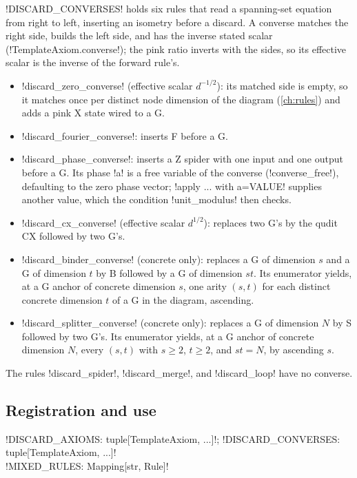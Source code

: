 \py!DISCARD_CONVERSES! holds six rules that read a spanning-set equation from right to left, inserting an isometry before a discard. A converse matches the right side, builds the left side, and has the inverse stated scalar (\py!TemplateAxiom.converse!); the pink ratio inverts with the sides, so its effective scalar is the inverse of the forward rule's.
\begin{itemize}
\item \py!discard_zero_converse! (effective scalar $d^{-1/2}$): its matched side is empty, so it matches once per distinct node dimension of the diagram (\cref{ch:rules}) and adds a pink X state wired to a G.
\item \py!discard_fourier_converse!: inserts F before a G.
\item \py!discard_phase_converse!: inserts a Z spider with one input and one output before a G. Its phase \code!a! is a free variable of the converse (\py!converse_free!), defaulting to the zero phase vector; \code!apply ... with a=VALUE! supplies another value, which the condition \code!unit_modulus! then checks.
\item \py!discard_cx_converse! (effective scalar $d^{1/2}$): replaces two G's by the qudit CX followed by two G's.
\item \py!discard_binder_converse! (concrete only): replaces a G of dimension $s$ and a G of dimension $t$ by B followed by a G of dimension $st$. Its enumerator yields, at a G anchor of concrete dimension $s$, one arity $(s,t)$ for each distinct concrete dimension $t$ of a G in the diagram, ascending.
\item \py!discard_splitter_converse! (concrete only): replaces a G of dimension $N$ by S followed by two G's. Its enumerator yields, at a G anchor of concrete dimension $N$, every $(s,t)$ with $s\ge 2$, $t\ge 2$, and $st=N$, by ascending $s$.
\end{itemize}
The rules \code!discard_spider!, \code!discard_merge!, and \code!discard_loop! have no converse.

\subsection{Registration and use}

\begin{signature}
\py!DISCARD_AXIOMS: tuple[TemplateAxiom, ...]!; \py!DISCARD_CONVERSES: tuple[TemplateAxiom, ...]!\\
\py!MIXED_RULES: Mapping[str, Rule]!
\end{signature}

